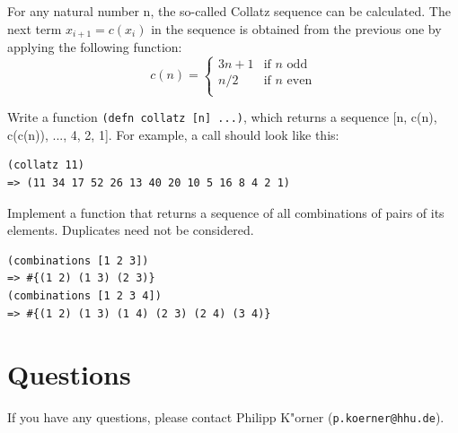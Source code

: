 \documentclass[11pt,a4paper]{article}
\begin{document}
\begin{exercise}
For any natural number n, the so-called Collatz sequence can be calculated.
The next term $x_{i+1} = c(x_i)$ in the sequence is obtained from the previous one by applying the following function:
\begin{equation*}
   c(n) =
   \begin{cases}
     3n+1 & \text{if } n \text{ odd} \\
     n/2  & \text{if } n \text{ even} \\
   \end{cases}
\end{equation*}

Write a function \texttt{(defn collatz [n] ...)}, which returns a sequence [n, c(n), c(c(n)), ..., 4, 2, 1]. For example, a call should look like this:

\begin{verbatim}
(collatz 11)
=> (11 34 17 52 26 13 40 20 10 5 16 8 4 2 1)
\end{verbatim}
\end{exercise}

\begin{exercise}[Combinations]

Implement a function that returns a sequence of all combinations of pairs of its elements. Duplicates need not be considered.

\begin{verbatim}
(combinations [1 2 3])
=> #{(1 2) (1 3) (2 3)}
(combinations [1 2 3 4])
=> #{(1 2) (1 3) (1 4) (2 3) (2 4) (3 4)}

\end{verbatim}
\end{exercise}

\section*{Questions}
If you have any questions, please contact Philipp K"orner (\texttt{p.koerner@hhu.de}).
\end{document}

